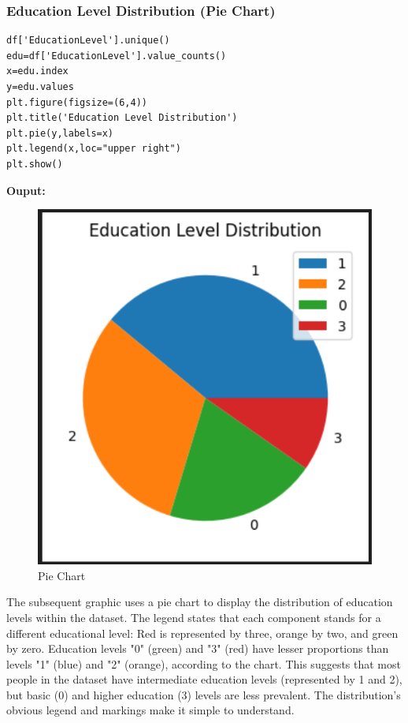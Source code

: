 \subsubsection{Education Level Distribution (Pie Chart)}
\begin{verbatim}
df['EducationLevel'].unique()
edu=df['EducationLevel'].value_counts()
x=edu.index
y=edu.values
plt.figure(figsize=(6,4))
plt.title('Education Level Distribution')
plt.pie(y,labels=x)
plt.legend(x,loc="upper right")
plt.show()
\end{verbatim}

\textbf{Ouput:}
\begin{figure}[h]
\centering
\includegraphics[width=0.7\linewidth]{Images/g2.png}
\caption{Pie Chart}
\label{fig:enter-label}
\end{figure}
The subsequent graphic uses a pie chart to display the distribution of education levels within the dataset. The legend states that each component stands for a different educational level: Red is represented by three, orange by two, and green by zero. Education levels "0" (green) and "3" (red) have lesser proportions than levels "1" (blue) and "2" (orange), according to the chart. This suggests that most people in the dataset have intermediate education levels (represented by 1 and 2), but basic (0) and higher education (3) levels are less prevalent. The distribution's obvious legend and markings make it simple to understand.

